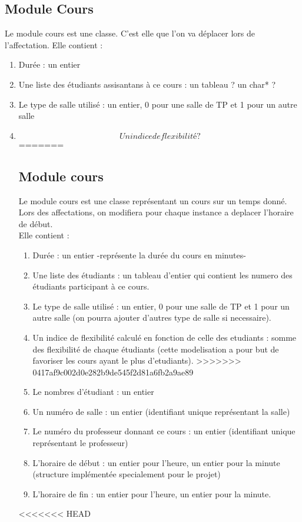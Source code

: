 \documentclass[a4paper,11pt]{article}
\begin{document}
	\subsection{Module Cours}
		Le module cours est une classe. C'est elle que l'on va déplacer lors de l'affectation. Elle contient : 
		\begin{enumerate}
			\item Durée : un entier
			\item Une liste des étudiants assisantans à ce cours : un tableau ? un char* ?
			\item Le type de salle utilisé : un entier, 0 pour une salle de TP et 1 pour un autre salle
			\item $$Un indice de flexibilité ?$$
=======
	\subsection{Module cours}
		Le module cours est une classe représentant un cours sur un temps donné.\\
		Lors des affectations, on modifiera pour chaque instance a deplacer l'horaire de début.\\
		Elle contient : 
		\begin{enumerate}
			\item Durée : un entier -représente la durée du cours en minutes-
			\item Une liste des étudiants : un tableau d'entier qui contient les numero des étudiants participant à ce cours.
			\item Le type de salle utilisé : un entier, 0 pour une salle de TP et 1 pour un autre salle (on pourra ajouter d'autres type de salle si necessaire).
			\item Un indice de flexibilité calculé en fonction de celle des etudiants : somme des flexibilité de chaque étudiants (cette modelisation a pour but de favoriser les cours ayant le plus d'etudiants).
>>>>>>> 0417af9c002d0e282b9de545f2d81a6fb2a9ae89
			\item Le nombres d'étudiant : un entier
			\item Un numéro de salle : un entier (identifiant unique représentant la salle)
			\item Le numéro du professeur donnant ce cours : un entier (identifiant unique représentant le professeur)
			\item L'horaire de début : un entier pour l'heure, un entier pour la minute (structure implémentée specialement pour le projet)  
			\item L'horaire de fin : un entier pour l'heure, un entier pour la minute.
		\end{enumerate}
<<<<<<< HEAD

\end{enumerate}
\end{document}
